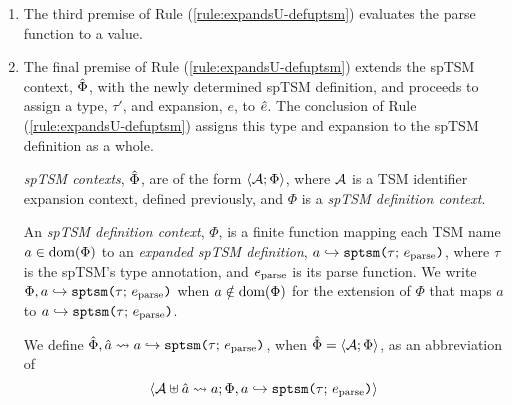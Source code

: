 {{{{\begin{enumerate}
\item The third premise of Rule (\ref{rule:expandsU-defuptsm}) evaluates the parse function to a value.
\item The final premise of Rule (\ref{rule:expandsU-defuptsm}) extends the spTSM context, $\hat\Phi$, with the newly determined {spTSM definition}, and proceeds to assign a type, $\tau'$, and expansion, $e$, to ${\hat e}$. The conclusion of Rule (\ref{rule:expandsU-defuptsm}) assigns this type and expansion to the spTSM definition as a whole.%



\emph{spTSM contexts}, $\hat\Phi$, are of the form $\langle \mathcal{A}; \Phi \rangle$, where $\mathcal{A}$ is a {TSM identifier expansion context}, defined previously, and $\Phi$ is a \emph{spTSM definition context}. 


An \emph{spTSM definition context}, $\Phi$, is a finite function mapping each TSM name $a \in \text{dom}(\Phi)$ to an \emph{expanded spTSM definition}, $a \hookrightarrow \texttt{sptsm}\texttt{(}\tau;\,e_\text{parse}\texttt{)}$, where $\tau$ is the spTSM's type annotation, and $e_\text{parse}$ is its parse function. We write $\Phi, a \hookrightarrow \texttt{sptsm}\texttt{(}\tau;\,e_\text{parse}\texttt{)}$ when $a \notin \text{dom}(\Phi)$ for the extension of $\Phi$ that maps $a$ to $a \hookrightarrow \texttt{sptsm}\texttt{(}\tau;\,e_\text{parse}\texttt{)}$. %


We define $\hat\Phi, \hat{a} \leadsto a \hookrightarrow \texttt{sptsm}\texttt{(}\tau;\,e_\text{parse}\texttt{)}$, when $\hat\Phi=\langle \mathcal{A}; \Phi \rangle$, as an abbreviation of \[\langle \mathcal{A} \uplus \hat{a} \leadsto a; \Phi, a \hookrightarrow \texttt{sptsm}\texttt{(}\tau;\,e_\text{parse}\texttt{)} \rangle\]
\end{enumerate}
}}}}
